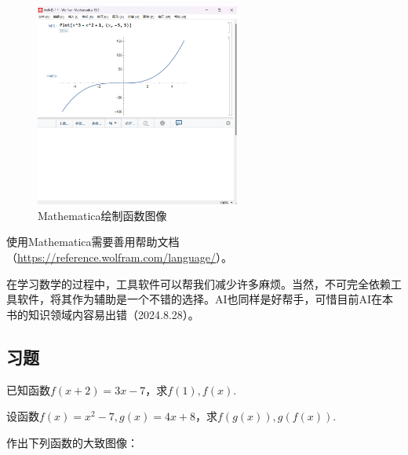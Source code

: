 \documentclass[lang=cn,math=cm,chinesefont=nofont,11pt,scheme=chinese,onecol]{elegantbook}
\begin{document}
\begin{figure}[h]
  \centering
  \includegraphics[width=0.6\textwidth]{image/mathematica2.png}
  \caption{Mathematica绘制函数图像}
  \label{img:mathematica2}
\end{figure}

使用Mathematica需要善用帮助文档（\href{https://reference.wolfram.com/language/}{https://reference.wolfram.com/language/}）。

在学习数学的过程中，工具软件可以帮我们减少许多麻烦。当然，不可完全依赖工具软件，将其作为辅助是一个不错的选择。AI也同样是好帮手，可惜目前AI在本书的知识领域内容易出错（2024.8.28）。

\subsection{习题}

\begin{exercise}\label{2017RJB.P94.8.changed}
  已知函数$f(x+2)=3x-7$，求$f(1),f(x)$.
\end{exercise}

\begin{exercise}
  设函数$f(x)=x^2-7,g(x)=4x+8$，求$f(g(x)),g(f(x))$.
\end{exercise}

\begin{exercise}
  作出下列函数的大致图像：
\end{exercise}
\end{document}
